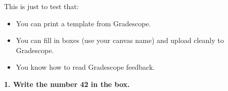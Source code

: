 \documentclass[11pt,letterpaper]{article}
\newcommand{\WorksheetNameBox}{%
  \begingroup\setlength{\fboxsep}{3pt}\setlength{\fboxrule}{0.4pt}%
  \fbox{\rule[-0.30in]{0pt}{0.42in}\makebox[4.24in][l]{Name:}}%
  \endgroup}
\begin{document}
\noindent\hfill\WorksheetNameBox\par

This is just to test that:
\begin{itemize}
	\item You can print a template from Gradescope.
	\item You can fill in boxes (use your canvas name) 
	and upload cleanly to Gradescope.
	\item You know how to read Gradescope feedback.
\end{itemize} 

\vspace{0.25in}
\textbf{1. Write the number 42 in the box.}\par
\vspace{0.15in}
\noindent\fbox{\rule[-0.25in]{0pt}{1in}\makebox[2in]{}}
\end{document}
